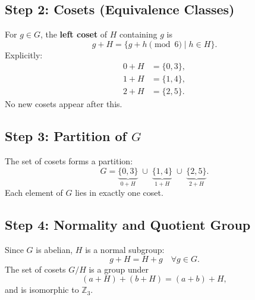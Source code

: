 \documentclass[12pt]{article}
\begin{document}
\subsection*{Step 2: Cosets (Equivalence Classes)}
For $g \in G$, the \textbf{left coset} of $H$ containing $g$ is
$$
g + H = \{ g + h \pmod{6} \mid h \in H \}.
$$
Explicitly:
\[
\begin{aligned}
	0 + H &= \{0,3\}, \\
	1 + H &= \{1,4\}, \\
	2 + H &= \{2,5\}.
\end{aligned}
\]
No new cosets appear after this.

\subsection*{Step 3: Partition of $G$}
The set of cosets forms a partition:
$$
G = \underbrace{\{0,3\}}_{0+H} \; \cup \;
\underbrace{\{1,4\}}_{1+H} \; \cup \;
\underbrace{\{2,5\}}_{2+H}.
$$
Each element of $G$ lies in exactly one coset.

\subsection*{Step 4: Normality and Quotient Group}
Since $G$ is abelian, $H$ is a normal subgroup:
$$
g + H = H + g \quad \forall g \in G.
$$
The set of cosets $G/H$ is a group under
$$
(a+H) + (b+H) = (a+b) + H,
$$
and is isomorphic to $\mathbb{Z}_3$.
\end{document}
